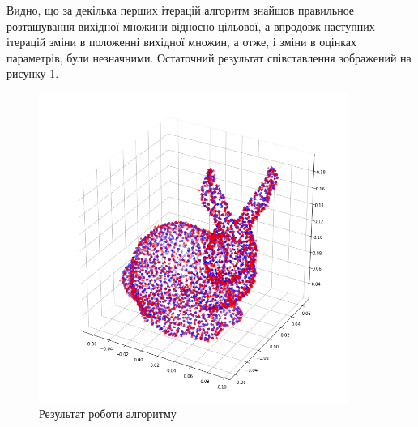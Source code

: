 Видно, що за декілька перших ітерацій алгоритм знайшов правильное розташування
вихідної множини відносно цільової,
а впродовж наступних ітерацій зміни в положенні вихідної множин, а отже,
і зміни в оцінках параметрів, були незначними.
Остаточний результат співставлення зображений на рисунку \ref{fig:bunny:result}.

\begin{figure}[h]
  \centering
    \includegraphics[width=0.9\textwidth]{images/bunny_result}
  \caption{Результат роботи алгоритму}
  \label{fig:bunny:result}
\end{figure}

